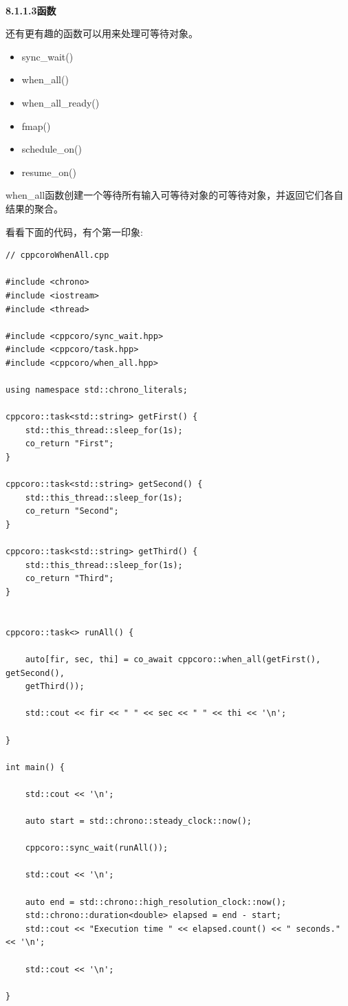 \hspace*{\fill} \\ %
\noindent
\textbf{8.1.1.3\hspace{0.2cm}函数}

还有更有趣的函数可以用来处理可等待对象。

\begin{itemize}
\item 
sync\_wait()

\item 
when\_all()

\item 
when\_all\_ready()

\item 
fmap()

\item 
schedule\_on()

\item 
resume\_on()
\end{itemize}

when\_all函数创建一个等待所有输入可等待对象的可等待对象，并返回它们各自结果的聚合。

看看下面的代码，有个第一印象:

\begin{lstlisting}[style=styleCXX]
// cppcoroWhenAll.cpp

#include <chrono>
#include <iostream>
#include <thread>

#include <cppcoro/sync_wait.hpp>
#include <cppcoro/task.hpp>
#include <cppcoro/when_all.hpp>

using namespace std::chrono_literals;

cppcoro::task<std::string> getFirst() {
	std::this_thread::sleep_for(1s);
	co_return "First";
}

cppcoro::task<std::string> getSecond() {
	std::this_thread::sleep_for(1s);
	co_return "Second";
}

cppcoro::task<std::string> getThird() {
	std::this_thread::sleep_for(1s);
	co_return "Third";
}


cppcoro::task<> runAll() {

	auto[fir, sec, thi] = co_await cppcoro::when_all(getFirst(), getSecond(),
	getThird());
	
	std::cout << fir << " " << sec << " " << thi << '\n';

}

int main() {

	std::cout << '\n';
	
	auto start = std::chrono::steady_clock::now();
	
	cppcoro::sync_wait(runAll());
	
	std::cout << '\n';
	
	auto end = std::chrono::high_resolution_clock::now();
	std::chrono::duration<double> elapsed = end - start;
	std::cout << "Execution time " << elapsed.count() << " seconds." << '\n';
	
	std::cout << '\n';

}
\end{lstlisting}

